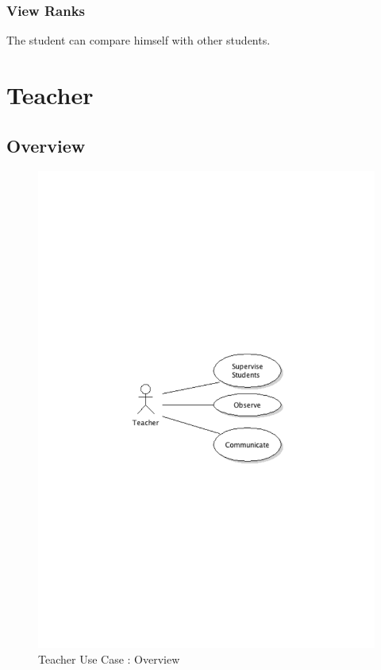 		\subsubsection{View Ranks}
			The student can compare himself with other students.
\newpage
\section{Teacher}
	\subsection{Overview}
		\begin{figure}[ht]
			\begin{center}
				\includegraphics[width=\textwidth,  trim=2cm 11cm 2cm 12cm]{UML_figure/UC/teacher/UC_Teacher_General.pdf}
				\caption{Teacher Use Case : Overview}
			\end{center}
		\end{figure}
